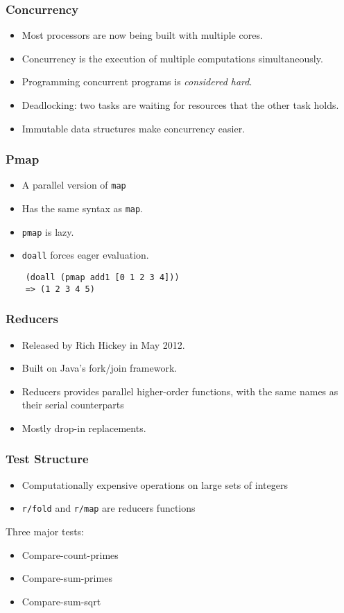 \documentclass{beamer}
\newcommand{\clocode}[1]{{\texttt {#1}}}
\begin{document}
\begin{frame}
\frametitle{Concurrency}
	\begin{itemize}
	 \item Most processors are now being built with multiple cores.
	 \item Concurrency is the execution of multiple computations simultaneously.
	 \item Programming concurrent programs is \textit{considered hard}.
	 \item Deadlocking: two tasks are waiting for resources that the other task holds.
	 \item Immutable data structures make concurrency easier.
	\end{itemize}	
\end{frame}
\begin{frame}[fragile]
\frametitle{Pmap}
	\begin{itemize}
	 \item A parallel version of \clocode{map}
	 \item Has the same syntax as \clocode{map}.
	 \item \clocode{pmap} is lazy.
	 \item \clocode{doall} forces eager evaluation. 
	\end{itemize}	
	\begin{verbatim}
	(doall (pmap add1 [0 1 2 3 4]))
	=> (1 2 3 4 5)
	\end{verbatim}
\end{frame}
\begin{frame}[fragile]
\frametitle{Reducers}
	\begin{itemize}
	 \item Released by Rich Hickey in May 2012.
	 \item Built on Java's fork/join framework.
	 \item Reducers provides parallel higher-order functions, with the same names as their serial counterparts
	 \item Mostly drop-in replacements.
	\end{itemize}
\end{frame}
\begin{frame}
\frametitle{Test Structure}
	\begin{itemize}
	\item Computationally expensive operations on large sets of integers
	\item \clocode{r/fold} and \clocode{r/map} are reducers functions
	\end{itemize}
	Three major tests:
	\begin{itemize}
	\item Compare-count-primes
	\item Compare-sum-primes
	\item Compare-sum-sqrt
	\end{itemize}
\end{frame}
\end{document}
